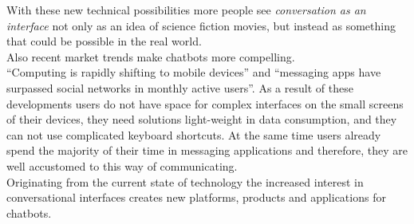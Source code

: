 With these new technical possibilities more people see \emph{conversation as an interface} not only as an idea of science fiction movies,
but instead as something that could be possible in the real world.
\\

Also recent market trends make chatbots more compelling.
\\
``Computing is rapidly shifting to mobile devices''\cite{mobileusage} and ``messaging apps have surpassed social networks in monthly active users''\cite{convtrends}.
As a result of these developments users do not have space for complex interfaces on the small screens of their devices,
they need solutions light-weight in data consumption, and they can not use complicated keyboard shortcuts.
At the same time users already spend the majority of their time in messaging applications
and therefore, they are well accustomed to this way of communicating.
\\

Originating from the current state of technology the increased interest in conversational interfaces creates new platforms, products and applications for chatbots.
